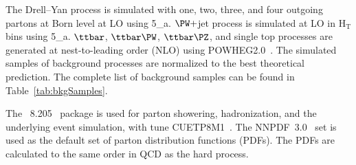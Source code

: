The Drell--Yan process is simulated with one, two, three, and four outgoing partons at Born level at LO using \MADGRAPH{}5\_a\MCATNLO. $\PW+$jet process is simulated at LO in $\mathrm{H_{T}}$ bins using \MADGRAPH{}5\_a\MCATNLO. $\ttbar$, $\ttbar \PW$, $\ttbar \PZ$, and single top processes are generated at nest-to-leading order (NLO) using \textsc{POWHEG2.0}~\cite{Alioli:2008gx,Nason:2004rx,Frixione:2007vw,powheg:2010}. The simulated samples of background processes are normalized to the best theoretical prediction. The complete list of background samples can be found in Table~\ref{tab:bkgSamples}.

The \PYTHIA~8.205~\cite{Sjostrand:2015} package is used  for parton showering, hadronization, and the underlying event simulation, with tune CUETP8M1~\cite{Skands:2014pea,Khachatryan:2015pea}. The NNPDF~3.0~\cite{nnpdf} set is used as the default set of parton distribution functions (PDFs). The PDFs are calculated to the same order in QCD as the hard process. 

